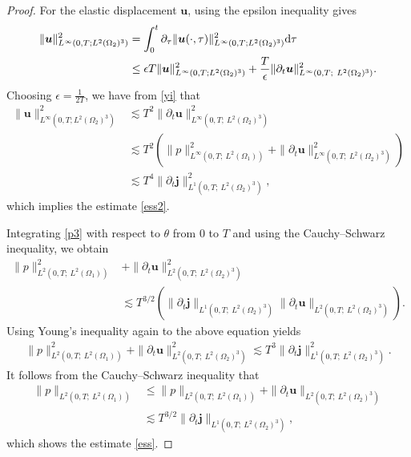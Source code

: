 \documentclass[final,leqno]{siamltex}
\begin{document}
\begin{proof}
For the elastic displacement $\boldsymbol u$,  using the epsilon inequality
gives
\begin{align*}
 \| \boldsymbol u\|^2_{L^{\infty} (0, T; L^2 (\Omega_2)^3)}& =\int_0^{t}
\partial_{\tau} \| \boldsymbol u (\cdot, \tau)\|^2_{L^{\infty} (0, T; L^2
(\Omega_2)^3)} {\rm d \tau}\\
& \leq \epsilon T \| \boldsymbol u\|^2_{L^{\infty} (0, T; L^2 (\Omega_2)^3)}+
\frac{T}{\epsilon}
  \|\partial_t \boldsymbol u\|^2_{L^{\infty}\left(0, T;~ L^2(\Omega_2)^3
\right)}.
\end{align*}
Choosing $\epsilon =\frac{1}{2T}$, we have from  \eqref{yi} that
\begin{align*}
 \| \boldsymbol u\|^2_{L^{\infty} (0, T; L^2 (\Omega_2)^3)}
  &\lesssim T^2  \|\partial_t \boldsymbol u\|^2_{L^{\infty}\left(0, T;~
L^2(\Omega_2)^3 \right)}\\
 &\lesssim T^2 \left( \|p\|^2_{L^{\infty}\left(0, T;~ L^2(\Omega_1) \right)}
+\|\partial_t \boldsymbol u\|^2_{L^{\infty}\left(0, T;~ L^2(\Omega_2)^3 \right)}
\right)\\
 & \lesssim T^4  \|\partial_t \boldsymbol j\|^2_{L^1(0, T; ~L^2 (\Omega_2)^3)},
\end{align*}
which implies the estimate \eqref{ess2}.

Integrating \eqref{p3} with respect to $\theta$ from $0$ to $T$ and using the
Cauchy--Schwarz inequality, we obtain
\begin{align*}
 \|p\|^2_{L^{2}\left(0, T;~ L^2(\Omega_1) \right)}& +\|\partial_t \boldsymbol
u\|^2_{L^{2}\left(0, T;~ L^2(\Omega_2)^3 \right)}\\
 &\lesssim T^{3/2} \left( \|\partial_t \boldsymbol j\|_{L^1(0, T; ~L^2
(\Omega_2)^3)} \|\partial_t \boldsymbol u\|_{L^{2}\left(0, T;~ L^2(\Omega_2)^3
\right)}\right).
\end{align*}
Using Young's inequality again to the above equation yields
 \begin{align}\label{yi2}
  \|p\|^2_{L^{2}\left(0, T;~ L^2(\Omega_1) \right)} +\|\partial_t \boldsymbol
u\|^2_{L^{2}\left(0, T;~ L^2(\Omega_2)^3 \right)}
  \lesssim T^3  \|\partial_t \boldsymbol j\|^2_{L^1(0, T; ~L^2 (\Omega_2)^3)}.
 \end{align}
It follows from the Cauchy--Schwarz inequality that
\begin{align*}
 \|p\|_{L^{2}\left(0, T;~ L^2(\Omega_1) \right)}
 &\leq  \|p\|_{L^{2}\left(0, T;~ L^2(\Omega_1) \right)} +\|\partial_t
\boldsymbol u\|_{L^{2}\left(0, T;~ L^2(\Omega_2)^3 \right)} \\
&\lesssim T^{3/2} \|\partial_t \boldsymbol j\|_{L^1(0, T; ~L^2 (\Omega_2)^3)},
\end{align*}
which shows the estimate \eqref{ess}.


\end{proof}
\end{document}
